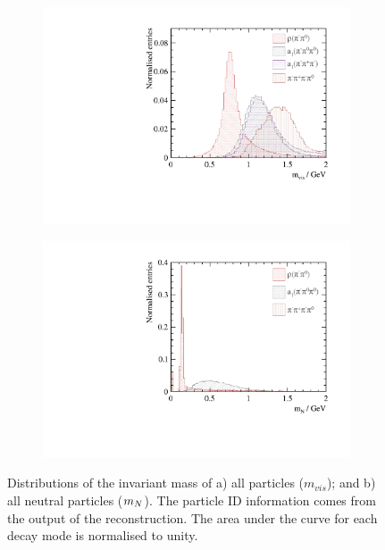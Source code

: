 \begin{figure}[htbp]
\centering
\begin{subfigure}[b]{0.45\textwidth}
 \includegraphics[width=\textwidth]{tau/var3/mVis_100GeV_improved_zoom.pdf}
  \caption{}
  \label{fig:tauVarMVis}
\end{subfigure}
\begin{subfigure}[b]{0.45\textwidth}
 \includegraphics[width=\textwidth]{tau/var3/mNeutral_100GeV_improved_zoom.pdf}
  \caption{}
  \label{fig:tauVarMNeutral}
\end{subfigure}
\caption
{Distributions of  the invariant mass of  a) all particles (${m}_{vis}$); and b) all neutral particles (${m}_{N}$). The particle ID information comes from the output of the \pandora reconstruction. The area under the curve for each decay mode is normalised to unity.}
\label{fig:tauVar2}
\end{figure}

